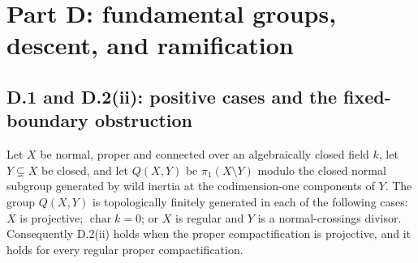 \section{Part D: fundamental groups, descent, and ramification}

\subsection{D.1 and D.2(ii): positive cases and the fixed-boundary obstruction}

\begin{proposition}
\label{D:fixed-boundary-positive}
Let $X$ be normal, proper and connected over an algebraically closed
field $k$, let $Y\subsetneq X$ be closed, and let $Q(X,Y)$ be
$\pi_1(X\setminus Y)$ modulo the closed normal subgroup generated
by wild inertia at the codimension-one components of $Y$.
The group $Q(X,Y)$ is topologically finitely generated in each of
the following cases: $X$ is projective; $\operatorname{char}k=0$;
or $X$ is regular and $Y$ is a normal-crossings divisor.
Consequently D.2(ii) holds when the proper compactification is
projective, and it holds for every regular proper compactification.
\end{proposition}

